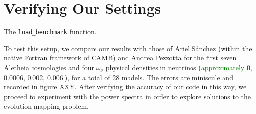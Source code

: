 \section{Verifying Our Settings}


The \verb|load_benchmark| function.


To test this setup, we compare our results with those of Ariel S\'{a}nchez 
(within the native Fortran framework of CAMB) and Andrea Pezzotta for the
first seven Aletheia cosmologies and four $\omega_\nu$ physical densities in
neutrinos (\textcolor{green}{approximately} 0, 0.0006, 0.002, 0.006.), for a 
total of 28
models. The errors are miniscule and recorded in figure XXY. After verifying
the accuracy of our code in this way, we proceed to experiment with the power
spectra in order to explore solutions to the evolution mapping problem.


